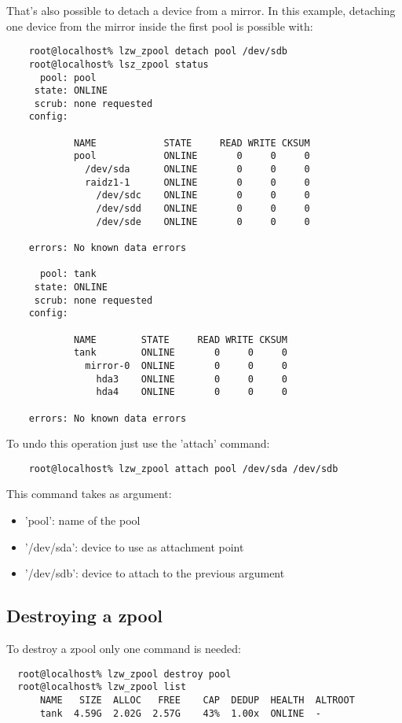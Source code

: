 \documentclass[english]{article}
\begin{document}
That's also possible to detach a device from a mirror. In this example,
detaching one device from the mirror inside the first pool is possible with:
\begin{verbatim}
    root@localhost% lzw_zpool detach pool /dev/sdb
    root@localhost% lsz_zpool status
      pool: pool
     state: ONLINE
     scrub: none requested
    config:
    
            NAME            STATE     READ WRITE CKSUM
            pool            ONLINE       0     0     0
              /dev/sda      ONLINE       0     0     0
              raidz1-1      ONLINE       0     0     0
                /dev/sdc    ONLINE       0     0     0
                /dev/sdd    ONLINE       0     0     0
                /dev/sde    ONLINE       0     0     0
    
    errors: No known data errors
    
      pool: tank
     state: ONLINE
     scrub: none requested
    config:
    
            NAME        STATE     READ WRITE CKSUM
            tank        ONLINE       0     0     0
              mirror-0  ONLINE       0     0     0
                hda3    ONLINE       0     0     0
                hda4    ONLINE       0     0     0
    
    errors: No known data errors
\end{verbatim}

To undo this operation just use the 'attach' command:
\begin{verbatim}
    root@localhost% lzw_zpool attach pool /dev/sda /dev/sdb
\end{verbatim}

This command takes as argument:
\begin{itemize}
    \item 'pool': name of the pool
    \item '/dev/sda': device to use as attachment point
    \item '/dev/sdb': device to attach to the previous argument
\end{itemize}

\subsection{Destroying a zpool}

To destroy a zpool only one command is needed:
\begin{verbatim}
  root@localhost% lzw_zpool destroy pool
  root@localhost% lzw_zpool list
      NAME   SIZE  ALLOC   FREE    CAP  DEDUP  HEALTH  ALTROOT
      tank  4.59G  2.02G  2.57G    43%  1.00x  ONLINE  -
\end{verbatim}
\end{document}
